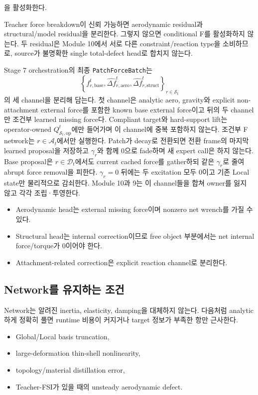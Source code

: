 \documentclass[11pt,a4paper]{article}
\begin{document}
을 활성화한다.

Teacher force breakdown이 신뢰 가능하면 aerodynamic residual과 structural/model residual을 분리한다.
그렇지 않으면 conditional F를 활성화하지 않는다. 두 residual은 Module 10에서 서로 다른
constraint/reaction type을 소비하므로, source가 불명확한 single total-defect head로 합치지 않는다.

Stage 7 orchestration의 최종 \texttt{PatchForceBatch}는
\begin{equation}
  \left\{
    f_{r,\mathrm{base}}^t,
    \widehat{\Delta f}_{r,\mathrm{aero}}^t,
    \widehat{\Delta f}_{r,\mathrm{struct}}^t
  \right\}_{r\in\mathcal S_t}
\end{equation}
의 세 channel을 분리해 담는다.
첫 channel은 analytic aero, gravity와 explicit non-attachment external force를 포함한
known base external force이고 뒤의 두 channel만 조건부 learned missing force다.
Compliant target와 hard-support lift는 operator-owned
\(Q_{\mathcal S_t,\mathrm{op}}^t\)에만 들어가며 이 channel에 중복 포함하지 않는다.
조건부 F network는 \(r\in\mathcal A_t\)에서만 실행한다.
Patch가 decay로 전환되면 전환 frame의 마지막 learned proposal을 저장하고
\(\gamma_r\)와 함께 0으로 fade하며 새 expert call은 하지 않는다.
Base proposal은 \(r\in\mathcal D_t\)에서도 current cached force를 gather하되
같은 \(\gamma_r\)로 줄여 abrupt force removal을 피한다.
\(\gamma_r=0\) 뒤에는 두 excitation 모두 0이고 기존 Local state만 물리적으로 감쇠한다.
Module 10과 9는 이 channel들을 합쳐 owner를 잃지 않고 각각 조립·투영한다.

\begin{itemize}[leftmargin=1.5em]
  \item Aerodynamic head는 external missing force이며 nonzero net wrench를 가질 수 있다.
  \item Structural head는 internal correction이므로 free object 부분에서는 net internal force/torque가 0이어야 한다.
  \item Attachment-related correction은 explicit reaction channel로 분리한다.
\end{itemize}

\subsection*{Network를 유지하는 조건}

Network는 알려진 inertia, elasticity, damping을 대체하지 않는다.
다음처럼 analytic하게 정확히 풀면 runtime 비용이 커지거나 target 정보가 부족한 항만 근사한다.

\begin{itemize}[leftmargin=1.5em]
  \item Global/Local basis truncation,
  \item large-deformation thin-shell nonlinearity,
  \item topology/material distillation error,
  \item Teacher-FSI가 있을 때의 unsteady aerodynamic defect.
\end{itemize}
\end{document}
